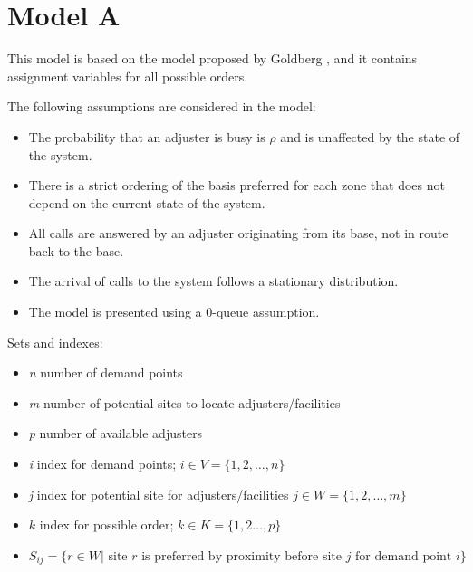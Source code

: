 
\section{Model A}

This model is based
on the model
proposed by Goldberg \cite{goldberg1990validating},
and it contains assignment variables
for all possible orders.

The following assumptions are considered in the model:
\begin{itemize}
\item The probability that an adjuster is busy
  is $\rho$ and is unaffected by the state of the system.
\item There is a strict ordering of the basis preferred for each zone
  that does not depend
  on the current state of the system.
\item All calls are answered
  by an adjuster originating from its base,
  not in route back to the base.
\item The arrival of calls to the system
  follows a stationary distribution.
\item The model is presented
  using a 0-queue assumption.
\end{itemize}

Sets and indexes:
\begin{itemize}
\item \textit{n} number of demand points
\item \textit{m} number of potential sites to locate adjusters/facilities
\item \textit{p} number of available adjusters
\item \textit{i} index for demand points;
  $i \in V = \{1,2,\ldots,n\}$ 
\item \textit{j} index for potential site for adjusters/facilities
  $j \in W = \{1,2,\ldots,m\}$
\item $k$ index for possible order;
  $k \in K = \{1,2\ldots,p\}$
\item $S_{ij} = \{
  r \in W | \mbox{ site } r \mbox{ is preferred by proximity before site } j
  \mbox{ for demand point } i
  \}$
\end{itemize}

